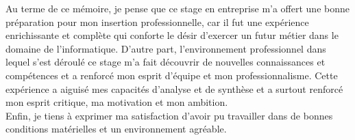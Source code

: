 Au terme de ce mémoire, je pense que ce stage en entreprise m’a offert une bonne préparation pour mon insertion professionnelle, car il fut une expérience enrichissante et complète qui conforte le désir d’exercer un futur métier dans le domaine de l’informatique. D'autre part, l'environnement professionnel dans lequel s'est déroulé ce stage m'a fait découvrir de nouvelles connaissances et compétences et a renforcé mon esprit d'équipe et mon professionnalisme. Cette expérience a aiguisé mes capacités d'analyse et de synthèse et a surtout renforcé mon esprit critique, ma motivation et mon ambition.\\
Enfin, je tiens à exprimer ma satisfaction d’avoir pu travailler dans de bonnes conditions matérielles et un environnement agréable.
